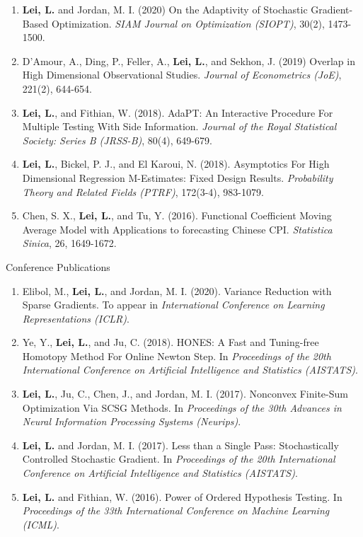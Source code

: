 \documentclass{article}
\begin{document}
\begin{enumerate}
\item \textbf{Lei, L.} and Jordan, M. I. (2020) On the Adaptivity of Stochastic Gradient-Based Optimization. \emph{SIAM Journal on Optimization (SIOPT)}, 30(2), 1473-1500.
\item D'Amour, A., Ding, P., Feller, A., \textbf{Lei, L.}, and Sekhon, J. (2019) Overlap in High Dimensional Observational Studies. \emph{Journal of Econometrics (JoE)}, 221(2), 644-654.
\item \textbf{Lei, L.}, and Fithian, W. (2018). AdaPT: An Interactive Procedure For Multiple Testing With Side Information. \emph{Journal of the Royal Statistical Society: Series B (JRSS-B)}, 80(4), 649-679.
\item \textbf{Lei, L.}, Bickel, P. J., and El Karoui, N. (2018). Asymptotics For High Dimensional Regression M-Estimates: Fixed Design Results. \emph{Probability Theory and Related Fields (PTRF)}, 172(3-4), 983-1079.
\item Chen, S. X., \textbf{Lei, L.}, and Tu, Y. (2016). Functional Coefficient Moving Average Model with Applications to forecasting Chinese CPI. \emph{Statistica Sinica}, 26, 1649-1672.
\end{enumerate}

\begin{large}
\noindent Conference Publications
\end{large}

\begin{enumerate}
\item Elibol, M., \textbf{Lei, L.}, and Jordan, M. I. (2020). Variance Reduction with Sparse Gradients. To appear in \emph{International Conference on Learning Representations (ICLR)}.
\item Ye, Y., \textbf{Lei, L.}, and Ju, C. (2018). HONES: A Fast and Tuning-free Homotopy Method For Online Newton Step. In \emph{Proceedings of the 20th International Conference on Artificial Intelligence and Statistics (AISTATS)}.
\item \textbf{Lei, L.}, Ju, C., Chen, J., and Jordan, M. I. (2017). Nonconvex Finite-Sum Optimization Via SCSG Methods. In \emph{Proceedings of the 30th Advances in Neural Information Processing Systems (Neurips)}.
\item \textbf{Lei, L.} and Jordan, M. I. (2017). Less than a Single Pass: Stochastically Controlled Stochastic Gradient. In \emph{Proceedings of the 20th International Conference on Artificial Intelligence and Statistics (AISTATS)}.
\item \textbf{Lei, L.} and Fithian, W. (2016). Power of Ordered Hypothesis Testing. In \emph{Proceedings of the 33th International Conference on Machine Learning (ICML)}.
\end{enumerate}
\end{document}
